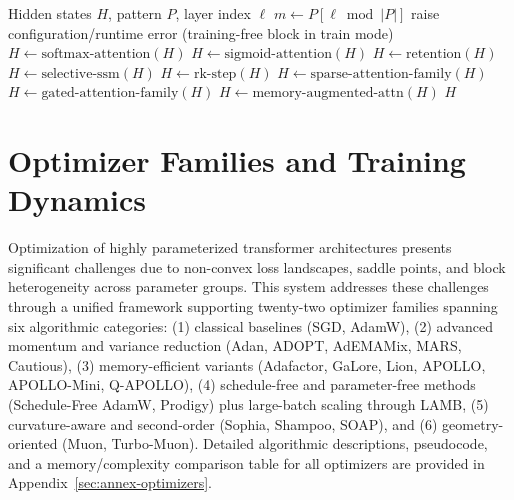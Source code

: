 \documentclass[11pt,a4paper]{article}
\begin{document}
\begin{algorithm}[t]
\caption{Pattern-Driven Mixer Forward (Conceptual)}
\begin{algorithmic}[1]
\Require Hidden states $H$, pattern $P$, layer index $\ell$
\State $m \gets P[\ell \bmod |P|]$
    \State raise configuration/runtime error (training-free block in train mode)
    \State $H \gets \text{softmax-attention}(H)$
    \State $H \gets \text{sigmoid-attention}(H)$
    \State $H \gets \text{retention}(H)$
    \State $H \gets \text{selective-ssm}(H)$
    \State $H \gets \text{rk-step}(H)$
    \State $H \gets \text{sparse-attention-family}(H)$
    \State $H \gets \text{gated-attention-family}(H)$
\Else
    \State $H \gets \text{memory-augmented-attn}(H)$
\EndIf
\State \Return $H$
\end{algorithmic}
\end{algorithm}

\section{Optimizer Families and Training Dynamics}
\label{sec:optimizer-families}

Optimization of highly parameterized transformer architectures presents significant challenges due to non-convex loss landscapes, saddle points, and block heterogeneity across parameter groups. This system addresses these challenges through a unified framework supporting twenty-two optimizer families spanning six algorithmic categories: (1) classical baselines (SGD, AdamW), (2) advanced momentum and variance reduction (Adan, ADOPT, AdEMAMix, MARS, Cautious), (3) memory-efficient variants (Adafactor, GaLore, Lion, APOLLO, APOLLO-Mini, Q-APOLLO), (4) schedule-free and parameter-free methods (Schedule-Free AdamW, Prodigy) plus large-batch scaling through LAMB, (5) curvature-aware and second-order (Sophia, Shampoo, SOAP), and (6) geometry-oriented (Muon, Turbo-Muon). Detailed algorithmic descriptions, pseudocode, and a memory/complexity comparison table for all optimizers are provided in Appendix~\ref{sec:annex-optimizers}.
\end{document}
